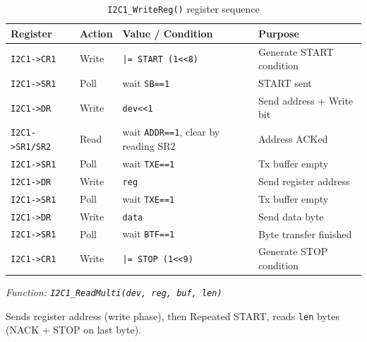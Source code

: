 \documentclass[12pt,a4paper]{article}
\begin{document}
\begin{table}[H]
\centering
\begin{tabular}{llll}
\hline
\textbf{Register} & \textbf{Action} & \textbf{Value / Condition} & \textbf{Purpose} \\
\hline
\texttt{I2C1->CR1}  & Write & \texttt{|= START (1<<8)} & Generate START condition \\
\texttt{I2C1->SR1}  & Poll  & wait \texttt{SB==1} & START sent \\
\texttt{I2C1->DR}   & Write & \texttt{dev<<1} & Send address + Write bit \\
\texttt{I2C1->SR1/SR2} & Read & wait \texttt{ADDR==1}, clear by reading SR2 & Address ACKed \\
\texttt{I2C1->SR1}  & Poll  & wait \texttt{TXE==1} & Tx buffer empty \\
\texttt{I2C1->DR}   & Write & \texttt{reg} & Send register address \\
\texttt{I2C1->SR1}  & Poll  & wait \texttt{TXE==1} & Tx buffer empty \\
\texttt{I2C1->DR}   & Write & \texttt{data} & Send data byte \\
\texttt{I2C1->SR1}  & Poll  & wait \texttt{BTF==1} & Byte transfer finished \\
\texttt{I2C1->CR1}  & Write & \texttt{|= STOP (1<<9)} & Generate STOP condition \\
\hline
\end{tabular}
\caption{\texttt{I2C1\_WriteReg()} register sequence}
\end{table}

\textit{Function: \texttt{I2C1\_ReadMulti(dev, reg, buf, len)}}

Sends register address (write phase), then Repeated START, reads \texttt{len} bytes (NACK + STOP on last byte).
\end{document}
